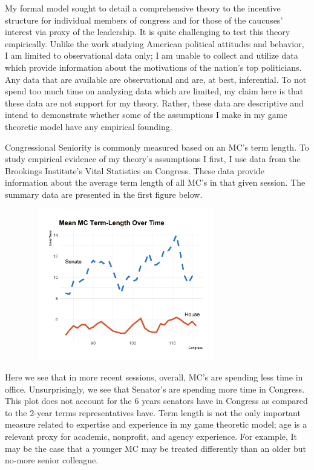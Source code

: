 \documentclass [12pt]{article}
\begin{document}
{{My formal model sought to detail a comprehensive theory to the incentive structure for individual members of congress and for those of the caucuses' interest via proxy of the leadership. It is quite challenging to test this theory empirically. Unlike the work studying American political attitudes and behavior, I am limited to observational data only; I am unable to collect and utilize data which provide information about the motivations of the nation's top politicians. Any data that are available are observational and are, at best, inferential. To not spend too much time on analyzing data which are limited, my claim here is that these data are not support for my theory. Rather, these data are descriptive and intend to demonstrate whether some of the assumptions I make in my game theoretic model have any empirical founding.

Congressional Seniority is commonly measured based on an MC's term length. To study empirical evidence of my theory's assumptions I first, I use data from the Brookings Institute's Vital Statistics on Congress. These data provide information about the average term length of all MC's in that given session. The summary data are presented in the first figure below.

\includegraphics[height=250, width=400]{../figures/term-time-plot.png}

Here we see that in more recent sessions, overall, MC's are spending less time in office. Unsurprisingly, we see that Senator's are spending more time in Congress. This plot does not account for the 6 years senators have in Congress as compared to the 2-year terms representatives have. Term length is not the only important measure related to expertise and experience in my game theoretic model; age is a relevant proxy for academic, nonprofit, and agency experience. For example, It may be the case that a younger MC may be treated differently than an older but no-more senior colleague. 

}}
\end{document}
